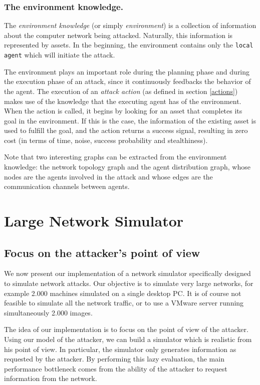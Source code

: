 \documentclass{llncs}
\begin{document}
\subsubsection{The environment knowledge.}

The \emph{environment knowledge} (or simply \emph{environment}) is a collection of information
about the computer network being attacked.
Naturally, this information is represented by assets.
In the beginning, the environment contains only 
the {\tt local agent} which will initiate the attack.

The environment plays an important role during the planning phase
and during the execution phase of an attack, since it 
continuously feedbacks the behavior of the agent.
The execution of an \emph{attack action} (as defined in section \ref{actions}) 
makes use of the knowledge that the executing agent has 
of the environment.  
When the action is called, it begins by looking for an asset that
completes its goal in the environment.
If this is the case, the information of the existing asset is used to fulfill the goal, 
and the action returns a success signal, resulting in zero cost 
(in terms of time, noise, success probability and stealthiness).

Note that two interesting graphs can be extracted from the environment knowledge:
the network topology graph and 
the agent distribution graph, whose nodes are the agents involved in the attack
and whose edges are the communication channels between agents.



\section{Large Network Simulator}
\label{simulator}

\subsection{Focus on the attacker's point of view}

We now present our implementation of a network simulator
specifically designed to simulate network attacks.
Our objective is to simulate very large networks,
for example 2.000 machines simulated on a single desktop PC.
It is of course not feasible to simulate all the network traffic,
or to use a VMware server running simultaneously 2.000 images. 


The idea of our implementation is to 
focus on the point of view of the attacker.
Using our model of the attacker, we can build a simulator
which is realistic from his point of view.
In particular, the simulator only generates information as requested by the attacker.
By performing this lazy evaluation, the main performance bottleneck comes
from the ability of the attacker to request information from the network.
  
\end{document}

